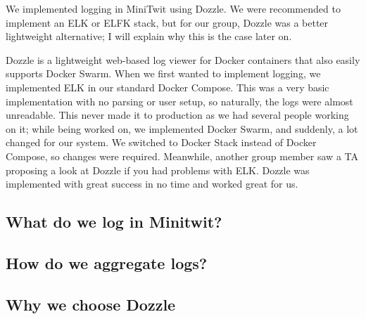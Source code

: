 We implemented logging in MiniTwit using Dozzle. We were recommended to implement an ELK or ELFK stack, but for our group, Dozzle was a better lightweight alternative; I will explain why this is the case later on.


Dozzle is a lightweight web-based log viewer for Docker containers that also easily supports Docker Swarm. When we first wanted to implement logging, we implemented ELK in our standard Docker Compose. This was a very basic implementation with no parsing or user setup, so naturally, the logs were almost unreadable. This never made it to production as we had several people working on it; while being worked on, we implemented Docker Swarm, and suddenly, a lot changed for our system. We switched to Docker Stack instead of Docker Compose, so changes were required. Meanwhile, another group member saw a TA proposing a look at Dozzle if you had problems with ELK. Dozzle was implemented with great success in no time and worked great for us.

\subsection*{What do we log in Minitwit?}



\subsection*{How do we aggregate logs?}


\subsection*{Why we choose Dozzle}

